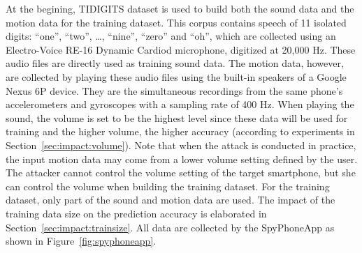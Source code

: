At the begining, TIDIGITS dataset is used to build both the sound data and the motion data for the training dataset.
%
This corpus contains speech of 11 isolated digits: ``one'', ``two'', \ldots, ``nine'', ``zero'' and ``oh'', which are collected using an Electro-Voice RE-16 Dynamic Cardiod microphone, digitized at 20,000 Hz.
%
%
These audio files are directly used as training sound data. 
The motion data, however, are collected by playing these audio files using the built-in speakers of a Google Nexus 6P device. They are the simultaneous recordings from the same phone's  accelerometers and gyroscopes with a sampling rate of 400 Hz.
When playing the sound, the volume is set to be the highest level since these data will be used for training and the higher volume, the higher accuracy (according to experiments in Section~\ref{sec:impact:volume}).
Note that when the {\attackName} attack is conducted in practice, the input motion data may come from a lower volume setting defined by the user. The attacker cannot control the volume setting of the target smartphone, but she can control the volume when building the training dataset. 
%
For the training dataset, only part of the sound and motion data are used. The impact of the training data size on the prediction accuracy is elaborated in Section~\ref{sec:impact:trainsize}.
All data are collected by the SpyPhoneApp as shown in Figure~\ref{fig:spyphoneapp}.







%
%

%

